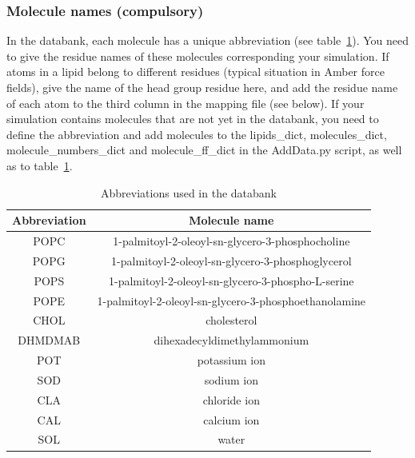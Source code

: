 \documentclass[fleqn,10pt]{wlscirep}
\begin{document}
\subsubsection*{Molecule names (compulsory)}
In the databank, each molecule has a unique abbreviation (see table~\ref{tab:abbreviations}). 
You need to give the residue names of these molecules corresponding your simulation.
If atoms in a lipid belong to different residues (typical situation in Amber force fields), give the name of the head group residue here, and add the residue name of each atom to the third column in the mapping file (see below). If your simulation contains molecules that are not yet in the databank, you need to define the abbreviation and add molecules to the lipids\_dict, molecules\_dict, molecule\_numbers\_dict and molecule\_ff\_dict in the AddData.py script, as well as to table~\ref{tab:abbreviations}. 

\begin{table}[h]
    \centering
    \begin{tabular}{c|c}
        Abbreviation & Molecule name \\
        \hline
        POPC &  1-palmitoyl-2-oleoyl-sn-glycero-3-phosphocholine\\
        POPG &  1-palmitoyl-2-oleoyl-sn-glycero-3-phosphoglycerol \\
        POPS & 1-palmitoyl-2-oleoyl-sn-glycero-3-phospho-L-serine \\
        POPE & 1-palmitoyl-2-oleoyl-sn-glycero-3-phosphoethanolamine \\
        CHOL & cholesterol \\
        DHMDMAB & dihexadecyldimethylammonium \\
        \hline
        POT & potassium ion \\
        SOD & sodium ion \\
        CLA & chloride ion \\
        CAL & calcium ion \\
        SOL & water \\
    \end{tabular}
    \caption{Abbreviations used in the databank}
    \label{tab:abbreviations}
\end{table}
\end{document}

